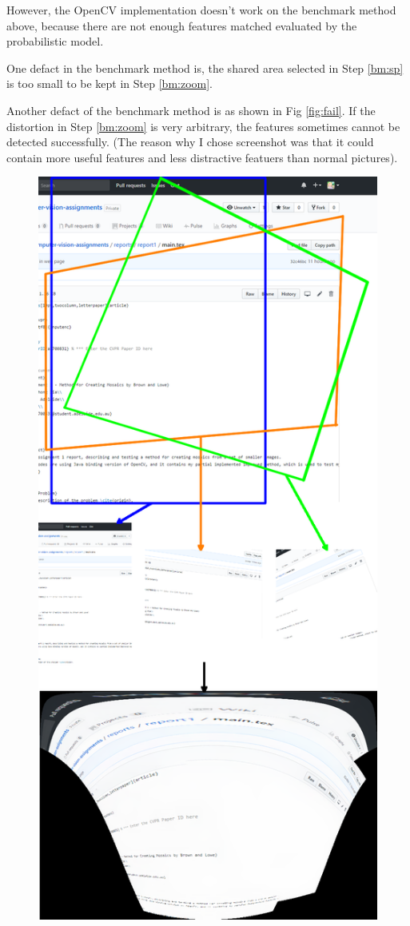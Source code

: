 \documentclass[10pt,twocolumn,letterpaper]{article}
\begin{document}
However, the OpenCV implementation doesn't work on the benchmark method above, because there are not enough features matched evaluated by the probabilistic model.

One defact in the benchmark method is, the shared area selected in Step \ref{bm:sp} is too small to be kept in Step \ref{bm:zoom}.

Another defact of the benchmark method is as shown in Fig \ref{fig:fail}.
If the distortion in Step \ref{bm:zoom} is very arbitrary, the features sometimes cannot be detected successfully.
(The reason why I chose screenshot was that it could contain more useful features and less distractive featuers than normal pictures).

\begin{figure}[t]
    \begin{center}
        \includegraphics[width=0.9\linewidth]{fail}

\end{center}
\end{figure}
\end{document}
